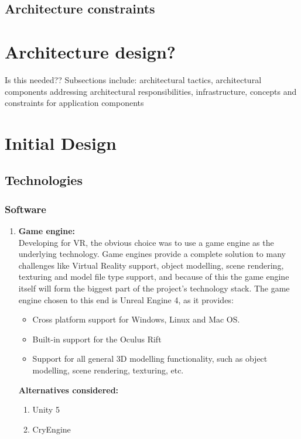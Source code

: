 \documentclass[a4paper,12pt]{report}
\begin{document}
\subsection{Architecture constraints}

\section{Architecture design?}
	Is this needed?? Subsections include: architectural tactics, architectural components addressing architectural responsibilities, infrastructure, concepts and constraints for application components

\newpage
%
%




\section{Initial Design}  %

\subsection{Technologies}
\subsubsection{Software}
\begin{enumerate}
	\item \textbf{Game engine:}\\
		Developing for VR, the obvious choice was to use a game engine as the underlying technology. Game engines provide a complete solution to many challenges like Virtual Reality support, object modelling, scene rendering, texturing and model file type support, and because of this the game engine itself will form the biggest part of the project's technology stack. The game engine chosen to this end is Unreal Engine 4, as it provides:
		\begin{itemize}
			\item Cross platform support for Windows, Linux and Mac OS.
			\item Built-in support for the Oculus Rift
			\item Support for all general 3D modelling functionality, such as object modelling, scene rendering, texturing, etc.
		\end{itemize}
		\textbf{Alternatives considered:}
		\begin{enumerate}
			\item Unity 5 %
			\item CryEngine %
		\end{enumerate}
\end{enumerate}
\end{document}
